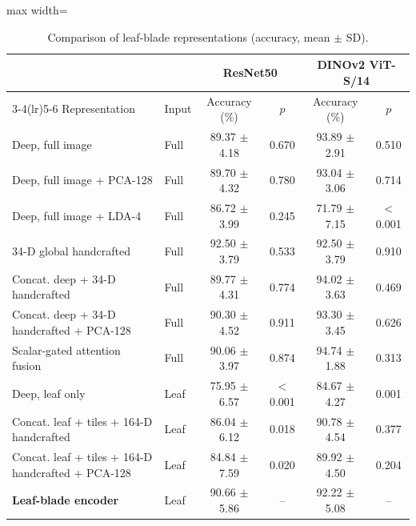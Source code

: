 \begin{table}[tbp]
\centering
\footnotesize
\caption{Comparison of leaf-blade representations (accuracy, mean $\pm$ SD).}
\label{tab:compare}
\begin{adjustbox}{max width=\textwidth}
\begin{tabular}{llcccc}
\toprule
 & & \multicolumn{2}{c}{ResNet50} & \multicolumn{2}{c}{DINOv2 ViT-S/14} \\
\cmidrule(lr){3-4}\cmidrule(lr){5-6}
Representation & Input & Accuracy (\%) & $p$ & Accuracy (\%) & $p$ \\
\midrule
Deep, full image & Full & 89.37 $\pm$ 4.18 & 0.670 & 93.89 $\pm$ 2.91 & 0.510 \\
Deep, full image + PCA-128 & Full & 89.70 $\pm$ 4.32 & 0.780 & 93.04 $\pm$ 3.06 & 0.714 \\
Deep, full image + LDA-4 & Full & 86.72 $\pm$ 3.99 & 0.245 & 71.79 $\pm$ 7.15 & $<$0.001 \\
34-D global handcrafted & Full & 92.50 $\pm$ 3.79 & 0.533 & 92.50 $\pm$ 3.79 & 0.910 \\
Concat. deep + 34-D handcrafted & Full & 89.77 $\pm$ 4.31 & 0.774 & 94.02 $\pm$ 3.63 & 0.469 \\
Concat. deep + 34-D handcrafted + PCA-128 & Full & 90.30 $\pm$ 4.52 & 0.911 & 93.30 $\pm$ 3.45 & 0.626 \\
Scalar-gated attention fusion & Full & 90.06 $\pm$ 3.97 & 0.874 & 94.74 $\pm$ 1.88 & 0.313 \\
\midrule
Deep, leaf only & Leaf & 75.95 $\pm$ 6.57 & $<$0.001 & 84.67 $\pm$ 4.27 & 0.001 \\
Concat. leaf + tiles + 164-D handcrafted & Leaf & 86.04 $\pm$ 6.12 & 0.018 & 90.78 $\pm$ 4.54 & 0.377 \\
Concat. leaf + tiles + 164-D handcrafted + PCA-128 & Leaf & 84.84 $\pm$ 7.59 & 0.020 & 89.92 $\pm$ 4.50 & 0.204 \\
\textbf{Leaf-blade encoder} & Leaf & 90.66 $\pm$ 5.86 & -- & 92.22 $\pm$ 5.08 & -- \\
\bottomrule
\end{tabular}
\end{adjustbox}
\end{table}
